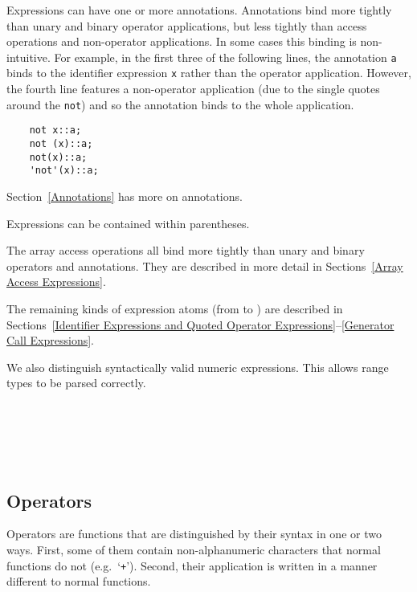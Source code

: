 \documentclass[10pt]{scrartcl}
\begin{document}
Expressions can have one or more annotations.  Annotations bind
more tightly than unary and binary operator applications, but less tightly
than access operations and non-operator applications.  In some cases this
binding is non-intuitive.  For example, in the first three of the following
lines, the annotation \texttt{a} binds to the identifier expression
\texttt{x} rather than the operator application.  However, the fourth
line features a non-operator application (due to the single quotes around
the \texttt{not}) and so the annotation binds to the whole application.
\begin{verbatim}
    not x::a;
    not (x)::a;
    not(x)::a;
    'not'(x)::a;
\end{verbatim}
Section~\ref{Annotations} has more on annotations.

Expressions can be contained within parentheses.

The array access operations
all bind more tightly than unary and binary operators and annotations.  
They are described in more detail in Sections~\ref{Array Access
Expressions}.

The remaining kinds of expression atoms (from  to
) are described in
Sections~\ref{Identifier Expressions and Quoted Operator Expressions}--\ref{Generator Call Expressions}.

We also distinguish syntactically valid numeric expressions.  This allows
range types to be parsed correctly.
\begin{productions}
    \RuleNumExpr \\
    \RuleNumExprAtom \\
    \RuleNumExprBinopTail \\
    \RuleNumExprAtomHead \\
\end{productions}

\subsection{Operators}
     \label{Operators}
Operators are functions that are distinguished by their syntax in one or two
ways.  First, some of them contain non-alphanumeric characters that normal
functions do not (e.g.~`\texttt{+}').  Second, their application is written
in a manner different to normal functions.
\end{document}
